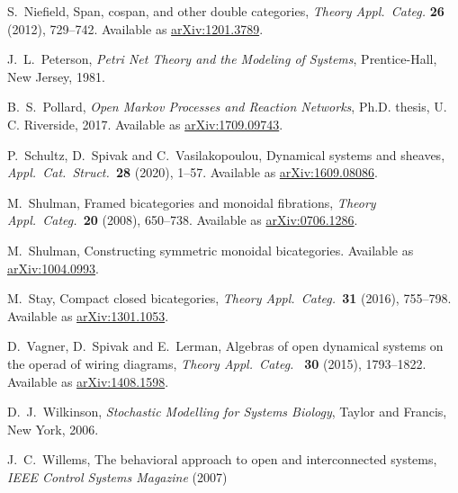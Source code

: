 \documentclass[reqno]{amsart}
\theoremstyle{definition}
\theoremstyle{remark}
\begin{document}
\begin{thebibliography}{100}
 S.~Niefield, Span, cospan, and other double categories, \textsl{Theory Appl.\ Categ.} \textbf{26} (2012), 729--742. Available as \href{https://arxiv.org/abs/1201.3789}{arXiv:1201.3789}.


 J.\ L.\ Peterson, \textit{Petri Net Theory and the Modeling of Systems}, Prentice-Hall, New Jersey, 1981.  

 B.\ S.\ Pollard, \textsl{Open Markov Processes and Reaction Networks}, Ph.D. thesis, U. C. Riverside, 2017.  Available as \href{https://arxiv.org/abs/1709.09743}{arXiv:1709.09743}.



 P.\ Schultz, D.\ Spivak and C.\ Vasilakopoulou, Dynamical systems and sheaves, \textsl{Appl.\ Cat.\ Struct.\ }\textbf{28} (2020), 1--57. Available as \href{https://arxiv.org/abs/1609.08086}{arXiv:1609.08086}.

 M.\ Shulman, Framed bicategories and monoidal fibrations, \textsl{Theory Appl.\ Categ.\ }\textbf{20} (2008), 650--738. Available as \href{https://arxiv.org/abs/0706.1286}{arXiv:0706.1286}.

 M.\ Shulman, Constructing symmetric monoidal bicategories. Available as \href{http://arxiv.org/abs/1004.0993}{arXiv:1004.0993}.

 M.\ Stay, Compact closed bicategories, \textsl{Theory Appl.\ Categ.\ }\textbf{31} (2016), 755--798.   Available as \href{http://arxiv.org/abs/1301.1053}{arXiv:1301.1053}.

 D.\ Vagner, D.\ Spivak and E.\ Lerman, Algebras of open dynamical systems on the operad of wiring diagrams, \textsl{Theory Appl.\ Categ.\ } \textbf{30} (2015), 1793--1822. Available as \href{https://arxiv.org/abs/1408.1598}{arXiv:1408.1598}.

 D.\ J.\ Wilkinson, \textsl{Stochastic Modelling for Systems Biology},
Taylor and Francis, New York, 2006.

 J.\ C.\ Willems, The behavioral approach to open and interconnected systems, \textsl{IEEE Control Systems Magazine} (2007)

\end{thebibliography}
\end{document}
